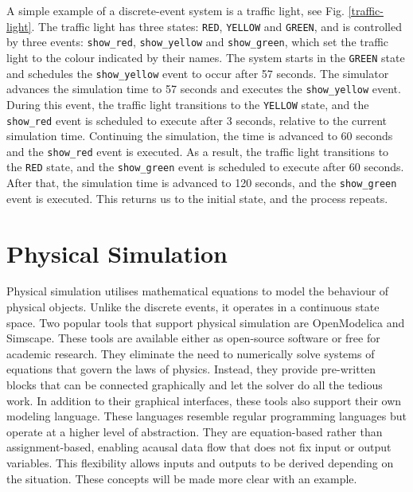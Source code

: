 \documentclass[conference]{IEEEtran}
\begin{document}
A simple example of a discrete-event system is a traffic light, see Fig. \ref{traffic-light}.
The traffic light has three states: \texttt{RED}, \texttt{YELLOW} and \texttt{GREEN},
and is controlled by three events: \texttt{show\_red}, \texttt{show\_yellow} and \texttt{show\_green}, which set the traffic light to the colour indicated by their names.
The system starts in the \texttt{GREEN} state and schedules the \texttt{show\_yellow} event to occur after 57 seconds.
The simulator advances the simulation time to 57 seconds and executes the \texttt{show\_yellow} event.
During this event, the traffic light transitions to the \texttt{YELLOW} state, and the \texttt{show\_red} event is scheduled to execute after 3 seconds, relative to the current simulation time.
Continuing the simulation, the time is advanced to 60 seconds and the \texttt{show\_red} event is executed.
As a result, the traffic light transitions to the \texttt{RED} state, and the \texttt{show\_green} event is scheduled to execute after 60 seconds.
After that, the simulation time is advanced to 120 seconds, and the \texttt{show\_green} event is executed.
This returns us to the initial state, and the process repeats.

\section{Physical Simulation}

Physical simulation utilises mathematical equations to model the behaviour of physical objects.
Unlike the discrete events, it operates in a continuous state space.
Two popular tools that support physical simulation are OpenModelica and Simscape.
These tools are available either as open-source software or free for academic research.
They eliminate the need to numerically solve systems of equations that govern the laws of physics.
Instead, they provide pre-written blocks that can be connected graphically and let the solver do all the tedious work.
In addition to their graphical interfaces, these tools also support their own modeling language. These languages resemble regular programming languages but operate at a higher level of abstraction.
They are equation-based rather than assignment-based, enabling acausal data flow that does not fix input or output variables.
This flexibility allows inputs and outputs to be derived depending on the situation.
These concepts will be made more clear with an example.
\end{document}

